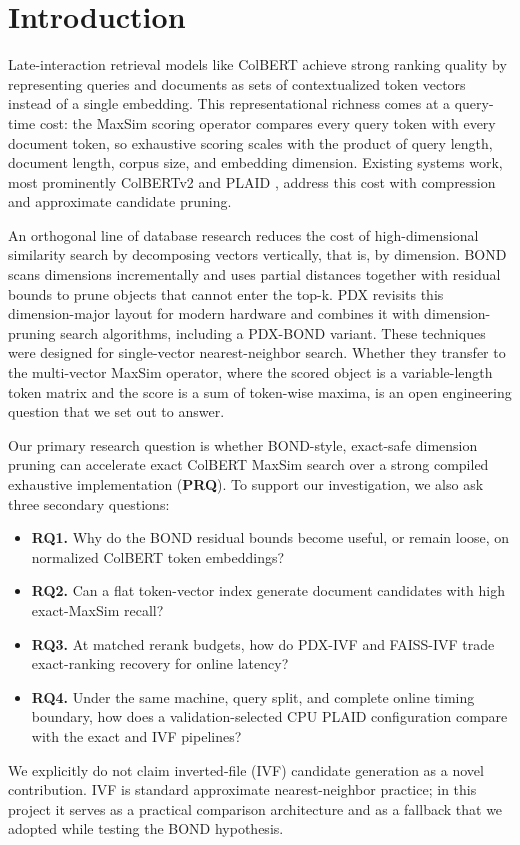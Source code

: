 \section{Introduction}
\label{sec:introduction}

Late-interaction retrieval models like ColBERT \citep{khattab2020colbert} achieve 
strong ranking quality by representing queries and documents as sets of contextualized 
token vectors instead of a single embedding. This representational richness comes at a 
query-time cost: the MaxSim scoring operator compares every query token with every 
document token, so exhaustive scoring scales with the product of query length, document 
length, corpus size, and embedding dimension. Existing systems work, most prominently 
ColBERTv2 \citep{santhanam2022colbertv2} and PLAID \citep{santhanam2022plaid}, address 
this cost with compression and approximate candidate pruning.

An orthogonal line of database research reduces the cost of high-dimensional similarity 
search by decomposing vectors vertically, that is, by dimension. BOND \citep{devries2002bond} 
scans dimensions incrementally and uses partial distances together with residual bounds 
to prune objects that cannot enter the top-k. PDX \citep{kuffo2025pdx} revisits this dimension-major 
layout for modern hardware and combines it with dimension-pruning search algorithms, including a 
PDX-BOND variant. These techniques were designed for single-vector nearest-neighbor search. Whether 
they transfer to the multi-vector MaxSim operator, where the scored object is a variable-length 
token matrix and the score is a sum of token-wise maxima, is an open engineering question that we 
set out to answer.

Our primary research question is whether BOND-style, exact-safe dimension pruning can accelerate 
exact ColBERT MaxSim search over a strong compiled exhaustive implementation (\textbf{PRQ}). To support our 
investigation, we also ask three secondary questions:
\begin{itemize}[noitemsep]
  \item \textbf{RQ1.} Why do the BOND residual bounds become useful, or remain loose, on normalized 
  ColBERT token embeddings?
  \item \textbf{RQ2.} Can a flat token-vector index generate document candidates with high exact-MaxSim recall?
  \item \textbf{RQ3.} At matched rerank budgets, how do PDX-IVF and FAISS-IVF trade exact-ranking 
  recovery for online latency?
  \item \textbf{RQ4.} Under the same machine, query split, and complete online
    timing boundary, how does a validation-selected CPU PLAID configuration
    compare with the exact and IVF pipelines?
\end{itemize}
We explicitly do not claim inverted-file (IVF) candidate generation as a novel contribution. IVF 
is standard approximate nearest-neighbor practice; in this project it serves as a practical comparison 
architecture and as a fallback that we adopted while testing the BOND hypothesis.

